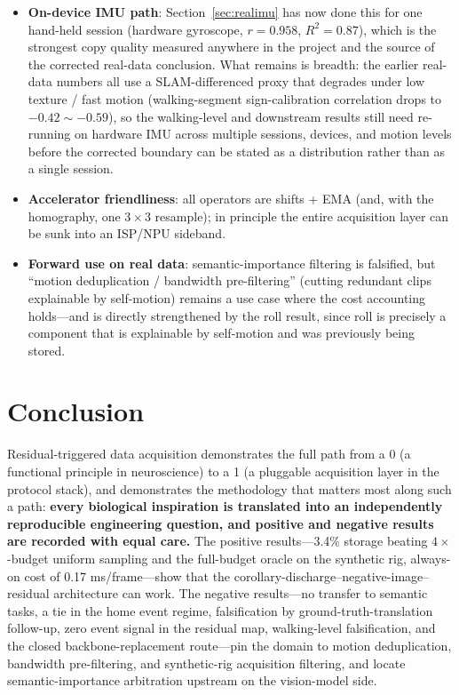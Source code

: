 \documentclass[12pt,a4paper]{article}
\begin{document}
\begin{itemize}
  \item \textbf{On-device IMU path}: Section~\ref{sec:realimu} has now done this for one hand-held session (hardware gyroscope, $r{=}0.958$, $R^2{=}0.87$), which is the strongest copy quality measured anywhere in the project and the source of the corrected real-data conclusion. What remains is breadth: the earlier real-data numbers all use a SLAM-differenced proxy that degrades under low texture / fast motion (walking-segment sign-calibration correlation drops to $-0.42 \sim -0.59$), so the walking-level and downstream results still need re-running on hardware IMU across multiple sessions, devices, and motion levels before the corrected boundary can be stated as a distribution rather than as a single session.
  \item \textbf{Accelerator friendliness}: all operators are shifts + EMA (and, with the homography, one $3\times3$ resample); in principle the entire acquisition layer can be sunk into an ISP/NPU sideband.
  \item \textbf{Forward use on real data}: semantic-importance filtering is falsified, but ``motion deduplication / bandwidth pre-filtering'' (cutting redundant clips explainable by self-motion) remains a use case where the cost accounting holds---and is directly strengthened by the roll result, since roll is precisely a component that is explainable by self-motion and was previously being stored.
\end{itemize}

\section*{Conclusion}

Residual-triggered data acquisition demonstrates the full path from a 0 (a functional principle in neuroscience) to a 1 (a pluggable acquisition layer in the protocol stack), and demonstrates the methodology that matters most along such a path: \textbf{every biological inspiration is translated into an independently reproducible engineering question, and positive and negative results are recorded with equal care.} The positive results---3.4\% storage beating $4\times$-budget uniform sampling and the full-budget oracle on the synthetic rig, always-on cost of 0.17 ms/frame---show that the corollary-discharge--negative-image--residual architecture can work. The negative results---no transfer to semantic tasks, a tie in the home event regime, falsification by ground-truth-translation follow-up, zero event signal in the residual map, walking-level falsification, and the closed backbone-replacement route---pin the domain to motion deduplication, bandwidth pre-filtering, and synthetic-rig acquisition filtering, and locate semantic-importance arbitration upstream on the vision-model side.
\end{document}
